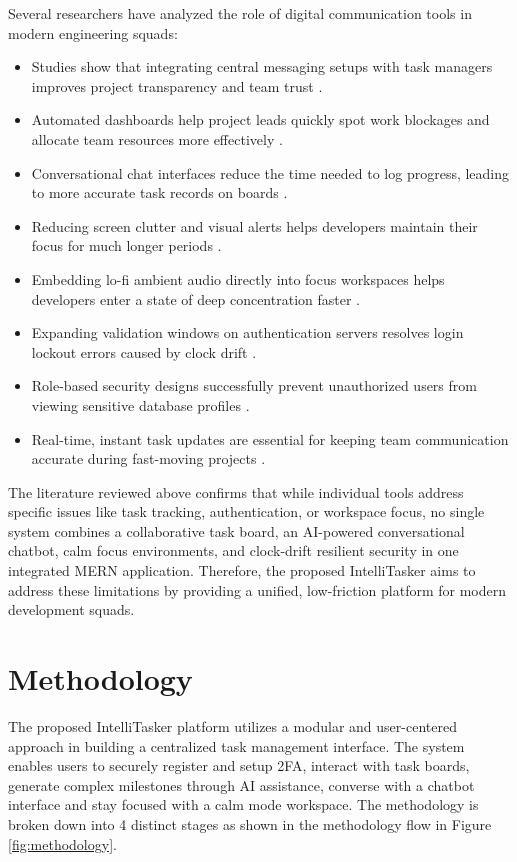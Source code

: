 \documentclass[conference]{IEEEtran}
\begin{document}
Several researchers have analyzed the role of digital communication tools in modern engineering squads:
\begin{itemize}
  \item Studies show that integrating central messaging setups with task managers improves project transparency and team trust \cite{ref1}.
  \item Automated dashboards help project leads quickly spot work blockages and allocate team resources more effectively \cite{ref2}.
  \item Conversational chat interfaces reduce the time needed to log progress, leading to more accurate task records on boards \cite{ref3}.
  \item Reducing screen clutter and visual alerts helps developers maintain their focus for much longer periods \cite{ref4}.
  \item Embedding lo-fi ambient audio directly into focus workspaces helps developers enter a state of deep concentration faster \cite{ref5}.
  \item Expanding validation windows on authentication servers resolves login lockout errors caused by clock drift \cite{ref6}.
  \item Role-based security designs successfully prevent unauthorized users from viewing sensitive database profiles \cite{ref7}.
  \item Real-time, instant task updates are essential for keeping team communication accurate during fast-moving projects \cite{ref8}.
\end{itemize}

The literature reviewed above confirms that while individual tools address specific issues like task tracking, authentication, or workspace focus, no single system combines a collaborative task board, an AI-powered conversational chatbot, calm focus environments, and clock-drift resilient security in one integrated MERN application. Therefore, the proposed IntelliTasker aims to address these limitations by providing a unified, low-friction platform for modern development squads.

\section{Methodology}
The proposed IntelliTasker platform utilizes a modular and user-centered approach in building a centralized task management interface. The system enables users to securely register and setup 2FA, interact with task boards, generate complex milestones through AI assistance, converse with a chatbot interface and stay focused with a calm mode workspace. The methodology is broken down into 4 distinct stages as shown in the methodology flow in Figure \ref{fig:methodology}.
\end{document}

